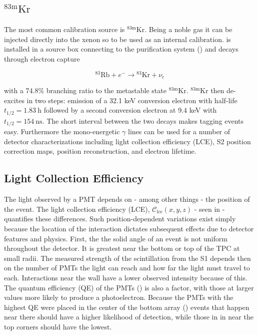 \subsection{$\mathrm{^{83m}Kr}$}
\label{subsec:det_char_kr}
The most common calibration source is $\mathrm{^{83m}Kr}$.  Being a noble gas it can be injected directly into the xenon so to be used as an
internal calibration.   is installed in a source box connecting to the purification system
() and decays through electron capture

\begin{equation}
\mathrm{^{83}Rb} + e^- \rightarrow \mathrm{^{83}Kr} + \nu_e
\end{equation}

\noindent with a 74.8\% branching ratio to the metastable state $\mathrm{^{83m}Kr}$.  $\mathrm{^{83m}Kr}$ then de-excites in two steps:
emission of a 32.1 keV
conversion electron with half-life $t_{1/2} = 1.83\ \mathrm{h}$ followed by a second conversion electron at 9.4 keV with
$t_{1/2} = 154\ \mathrm{ns}$.  The short
interval between the two decays makes tagging events easy.  Furthermore the mono-energetic $\gamma$ lines can be used for a number of
detector characterizations including light collection efficiency (LCE), S2 position correction maps, position reconstruction, and electron
lifetime.

\subsection{Light Collection Efficiency}
\label{subsec:det_char_lce}
The light observed by a PMT depends on - among other things - the position of the event.  The light collection efficiency (LCE),
$\mathcal{C}_{\mathrm{lce}}(x, y, z)$ - seen in  - quantifies these differences.  Such
position-dependent variations exist simply because the location of
the interaction dictates subsequent effects due to detector features and physics.  First, the the solid angle of an event is not uniform
throughout the detector.  It is greatest near the bottom or top of the TPC at small radii.  The measured strength of the scintillation
from the S1 depends then on the number of PMTs the light can reach and how far the light must travel to each.  Interactions near the
wall have a lower observed intensity because of this.  The quantum efficiency (QE) of the PMTs () is also a
factor, with those at larger values more likely to produce a photoelectron.  Because the PMTs with the highest QE were placed in the
center of the bottom array () events that happen near there should have a higher likelihood of detection,
while those in in near the top corners should have the lowest.

